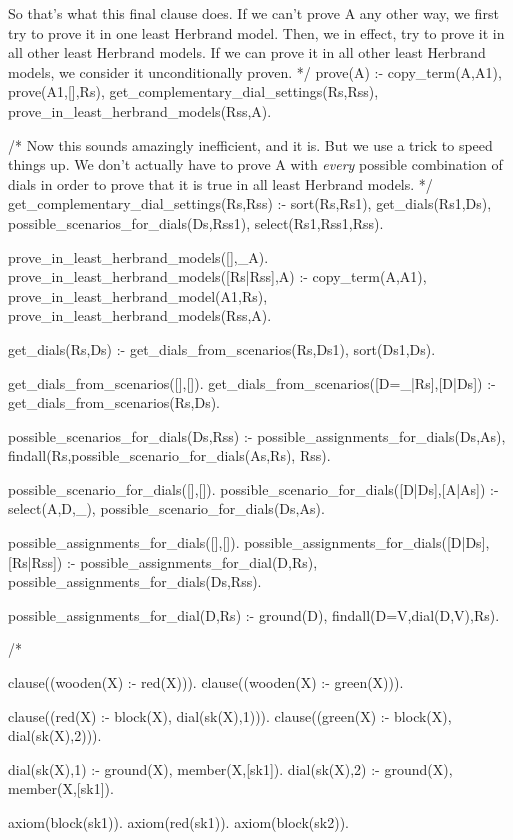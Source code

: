 \documentclass{book}[9pt]
\newenvironment{code}%
{\small \verbatim}%
{\endverbatim \large}
\begin{document}
So that's what this final clause does.  If we can't prove A any other
way, we first try to prove it in one least Herbrand model.  Then, we
in effect, try to prove it in all other least Herbrand models.  If we
can prove it in all other least Herbrand models, we consider it
unconditionally proven.
\begin{code}
*/
prove(A) :-
        copy_term(A,A1),
        prove(A1,[],Rs),
        get_complementary_dial_settings(Rs,Rss),
        prove_in_least_herbrand_models(Rss,A).

/*
\end{code}
\noindent Now this sounds amazingly inefficient, and it is.  But we
use a trick to speed things up.   We don't actually have to
prove A with {\em every} possible combination of dials in order to
prove that it is true in all least Herbrand models.
\begin{code}
*/
get_complementary_dial_settings(Rs,Rss) :-
        sort(Rs,Rs1),
        get_dials(Rs1,Ds),
        possible_scenarios_for_dials(Ds,Rss1),
        select(Rs1,Rss1,Rss).

prove_in_least_herbrand_models([],_A).
prove_in_least_herbrand_models([Rs|Rss],A) :-
        copy_term(A,A1),
        prove_in_least_herbrand_model(A1,Rs),
        prove_in_least_herbrand_models(Rss,A).


get_dials(Rs,Ds) :-
        get_dials_from_scenarios(Rs,Ds1),
        sort(Ds1,Ds).


get_dials_from_scenarios([],[]).
get_dials_from_scenarios([D=_|Rs],[D|Ds]) :-
        get_dials_from_scenarios(Rs,Ds).


possible_scenarios_for_dials(Ds,Rss) :-
        possible_assignments_for_dials(Ds,As),
        findall(Rs,possible_scenario_for_dials(As,Rs), Rss).

possible_scenario_for_dials([],[]).
possible_scenario_for_dials([D|Ds],[A|As]) :-
        select(A,D,_),
        possible_scenario_for_dials(Ds,As).


possible_assignments_for_dials([],[]).
possible_assignments_for_dials([D|Ds],[Rs|Rss]) :-
        possible_assignments_for_dial(D,Rs),
        possible_assignments_for_dials(Ds,Rss).

possible_assignments_for_dial(D,Rs) :- ground(D), findall(D=V,dial(D,V),Rs).

/*

clause((wooden(X) :- red(X))).
clause((wooden(X) :- green(X))).

clause((red(X) :- block(X), dial(sk(X),1))).
clause((green(X) :- block(X), dial(sk(X),2))).

dial(sk(X),1) :- ground(X), \+ member(X,[sk1]).
dial(sk(X),2) :- ground(X), \+ member(X,[sk1]).

axiom(block(sk1)).
axiom(red(sk1)).
axiom(block(sk2)).

\end{code}
\end{document}
